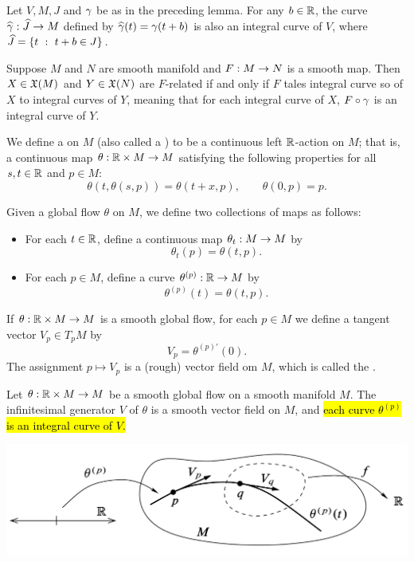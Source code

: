 \begin{lem}
Let $V, M, J$ and $\gamma$ be as in the preceding lemma. For any $b\in \mathbb{R}$, the curve $\widehat{\gamma}:\widehat J\rightarrow M$ defined by $\widehat{\gamma}(t) = \gamma(t + b)$ is also an integral curve of $V$, where $\widehat J = \{t\ :\ t + b \in J\}$.
\end{lem}

\begin{prop}
Suppose $M$ and $N$ are smooth manifold and $F:M\rightarrow N$ is a smooth map. Then $X\in \mathfrak{X}(M)$ and $Y\in \mathfrak{X}(N)$ are $F$-related if and only if $F$ tales integral curve so of $X$ to integral curves of $Y$, meaning that for each integral curve of $X$, $F\circ \gamma$ is an integral curve of $Y$.
\end{prop}

\dfn We define a  on $M$ (also called a ) to be a continuous left $\mathbb{R}$-action on $M$; that is, a continuous map $\theta:\mathbb{R}\times M\rightarrow M$ satisfying the following properties for all $s,t\in \mathbb{R}$ and $p\in M$:
\[\theta(t,\theta(s,p)) = \theta(t + x, p),\qquad \theta(0,p) = p.\]

\dfn Given a global flow $\theta$ on $M$, we define two collections of maps as follows:
\begin{itemize}
    \item For each $t\in \mathbb{R}$, define a continuous map $\theta_t:M\rightarrow M$ by 
    \[\theta_t(p) = \theta(t,p).\]
    \item For each $p\in M$, define a curve $\theta^{(p)}:\mathbb{R}\rightarrow M$ by 
    \[\theta^{(p)}(t) = \theta(t,p).\]
\end{itemize}

\dfn If $\theta:\mathbb{R}\times M\rightarrow M$ is a smooth global flow, for each $p\in M$ we define a tangent vector $V_p\in T_pM$ by 
\[V_p = \theta^{(p)\prime}(0).\]
The assignment $p\mapsto V_p$ is a (rough) vector field om $M$, which is called the .

\setcounter{thm}{6}

\begin{prop}
Let $\theta:\mathbb{R}\times M\rightarrow M$ be a smooth global flow on a smooth manifold $M$. The infinitesimal generator $V$ of $\theta$ is a smooth vector field on $M$, and \hl{each curve $\theta^{(p)}$ is an integral curve of $V$.}
\end{prop}

\begin{center}
    \includegraphics[scale = 0.3]{chapter09/c9f4.png}
\end{center}

